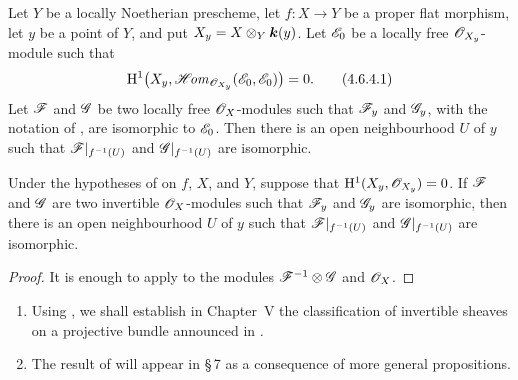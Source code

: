 \begin{corollary}[4.6.4]
\label{III.4.6.4}
Let $Y$ be a locally Noetherian prescheme, let $f:X\to Y$ be a
proper flat morphism, let $y$ be a point of $Y$, and put
$X_y=X\otimes_Y\boldsymbol{k}(y)$.  Let $\mathscr{E}_0$ be a locally free
$\mathscr{O}_{X_y}$-module such that
\[
\label{III.4.6.4.1}
  \mathrm{H}^1\bigl(
    X_y,\mathscr{H}\!\mathit{om}_{\mathscr{O}_{X_y}}(\mathscr{E}_0,\mathscr{E}_0)
  \bigr)=0.
  \tag{4.6.4.1}
\]
Let $\mathscr{F}$ and $\mathscr{G}$ be two locally free $\mathscr{O}_X$-modules
such that $\mathscr{F}_y$ and $\mathscr{G}_y$, with the notation of
, are isomorphic to $\mathscr{E}_0$.  Then there is an
open neighbourhood $U$ of $y$ such that
$\mathscr{F}|_{f^{-1}(U)}$ and $\mathscr{G}|_{f^{-1}(U)}$ are isomorphic.
\end{corollary}

\begin{corollary}[4.6.5]
\label{III.4.6.5}
Under the hypotheses of  on $f$, $X$, and $Y$,
suppose that $\mathrm{H}^1(X_y,\mathscr{O}_{X_y})=0$.
If $\mathscr{F}$ and $\mathscr{G}$ are two invertible $\mathscr{O}_X$-modules such
that $\mathscr{F}_y$ and $\mathscr{G}_y$ are isomorphic, then there is an open
neighbourhood $U$ of $y$ such that $\mathscr{F}|_{f^{-1}(U)}$ and
$\mathscr{G}|_{f^{-1}(U)}$ are isomorphic.
\end{corollary}

\begin{proof}
It is enough to apply  to the modules
$\mathscr{F}^{-1}\otimes\mathscr{G}$ and $\mathscr{O}_X$.
\end{proof}

\begin{remarks}[4.6.6]
\label{III.4.6.6}
\begin{enumerate}
\item[(i)] Using , we shall establish in Chapter~V
  the classification of invertible sheaves on a projective bundle
  announced in .
\item[(ii)] The result of  will appear in \S\,7 as
  a consequence of more general propositions.
\end{enumerate}
\end{remarks}

